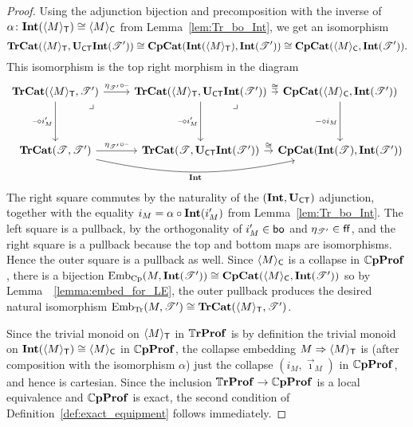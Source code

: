 \documentclass[11pt,oneside,article]{memoir}
\begin{document}
\begin{proof}
  Using the adjunction bijection and precomposition with the inverse of
  $\alpha\colon\mathbf{Int}(\langle M\rangle_{\mathsf{T}})\cong\langle M\rangle_{\mathsf{C}}$ from Lemma~\ref{lem:Tr_bo_Int},
  we get an isomorphism
  \[
    \mathbf{TrCat}(\langle M\rangle_{\mathsf{T}},\mathbf{U}_{\mathsf{CT}}\mathbf{Int}(\mathscr{T}'))
    \cong \mathbf{CpCat}(\mathbf{Int}(\langle M\rangle_{\mathsf{T}}),\mathbf{Int}(\mathscr{T}'))
    \cong \mathbf{CpCat}(\langle M\rangle_{\mathsf{C}},\mathbf{Int}(\mathscr{T}')).
  \]
  This isomorphism is the top right morphism in the diagram
  \[ \begin{tikzcd}[column sep=between origins,row sep=between origins]
    \TrCat(\Col{M}_{\MTCfont{T}},\cat{T}')
        \ar[r,"\eta_{\cat{T}'}\circ\textrm{--}"]
        \ar[d,"\textrm{--}\circ i'_M"']
        \ar[dr,phantom,"\lrcorner" very near start]
      &[2.4em,between borders] \TrCat(\Col{M}_{\MTCfont{T}},\UCT\Int(\cat{T}'))
        \ar[d,"\textrm{--}\circ i'_M"']
        \ar[r,"\iso"]
        \ar[dr,phantom,"\lrcorner" very near start]
      &[12.8em] \CompCat(\Col{M}_{\MTCfont{C}},\Int(\cat{T}')) \ar[d,"-\circ i_M"'] \\[5.4em]
    \TrCat(\cat{T},\cat{T}')
        \ar[r,"\eta_{\cat{T}'}\circ\textrm{--}"]
        \ar[rr,bend right=12,"\Int"']
      & \TrCat(\cat{T},\UCT\Int(\cat{T}'))
        \ar[r,"\iso"]
      & \CompCat(\Int(\cat{T}),\Int(\cat{T}'))
  \end{tikzcd} \]
  The right square commutes by the naturality of the $(\mathbf{Int},\mathbf{U}_{\mathsf{CT}})$ adjunction, together with the
  equality $i_M=\alpha\circ\mathbf{Int}(i'_M)$ from Lemma~\ref{lem:Tr_bo_Int}. The left square is a
  pullback, by the orthogonality of $i'_M\in\mathsf{bo}$ and $\eta_{\mathscr{T}'}\in\mathsf{ff}$, and the right square
  is a pullback because the top and bottom maps are isomorphisms. Hence the outer square is a
  pullback as well. Since $\langle M\rangle_{\mathsf{C}}$ is a collapse in $\mathbb{C}\mathbf{pProf}$, there is a
  bijection $\mathrm{Emb}_{\mathrm{Cp}}(M,\mathbf{Int}(\mathscr{T}'))\cong\mathbf{CpCat}(\langle M\rangle_{\mathsf{C}},\mathbf{Int}(\mathscr{T}'))$
  so by Lemma~~\ref{lemma:embed_for_LE}, the outer pullback produces the desired natural isomorphism
  $\mathrm{Emb}_{\mathrm{Tr}}(M,\mathscr{T}')\cong\mathbf{TrCat}(\langle M\rangle_{\mathsf{T}},\mathscr{T}')$.
   
  Since the trivial monoid on $\langle M\rangle_{\mathsf{T}}$ in $\mathbb{T}\mathbf{rProf}$ is by definition the trivial
  monoid on $\mathbf{Int}(\langle M\rangle_{\mathsf{T}})\cong\langle M\rangle_{\mathsf{C}}$ in $\mathbb{C}\mathbf{pProf}$, the collapse
  embedding $M\Rightarrow\langle M\rangle_{\mathsf{T}}$ is (after composition with the isomorphism $\alpha$)
  just the collapse $(i_M,\vec{\imath}_M)$ in $\mathbb{C}\mathbf{pProf}$, and hence is cartesian. Since the
  inclusion $\mathbb{T}\mathbf{rProf}\to\mathbb{C}\mathbf{pProf}$ is a local equivalence and $\mathbb{C}\mathbf{pProf}$ is exact, the second
  condition of Definition~\ref{def:exact_equipment} follows immediately.
\end{proof}
\end{document}

